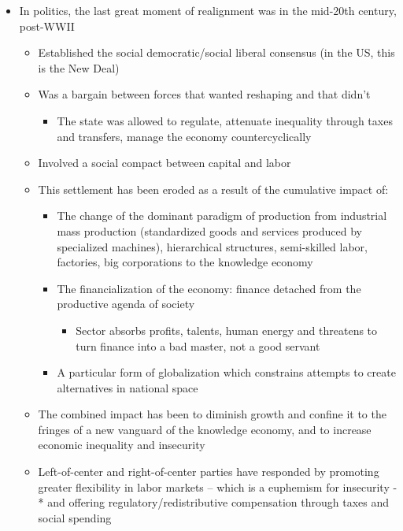 \begin{itemize}
\tightlist
\item
  In politics, the last great moment of realignment was in the mid-20th
  century, post-WWII

  \begin{itemize}
  \tightlist
  \item
    Established the social democratic/social liberal consensus (in the
    US, this is the New Deal)
  \item
    Was a bargain between forces that wanted reshaping and that didn't

    \begin{itemize}
    \tightlist
    \item
      The state was allowed to regulate, attenuate inequality through
      taxes and transfers, manage the economy countercyclically
    \end{itemize}
  \item
    Involved a social compact between capital and labor
  \item
    This settlement has been eroded as a result of the cumulative impact
    of:

    \begin{itemize}
    \tightlist
    \item
      The change of the dominant paradigm of production from industrial
      mass production (standardized goods and services produced by
      specialized machines), hierarchical structures, semi-skilled
      labor, factories, big corporations to the knowledge economy
    \item
      The financialization of the economy: finance detached from the
      productive agenda of society

      \begin{itemize}
      \tightlist
      \item
        Sector absorbs profits, talents, human energy and threatens to
        turn finance into a bad master, not a good servant
      \end{itemize}
    \item
      A particular form of globalization which constrains attempts to
      create alternatives in national space
    \end{itemize}
  \item
    The combined impact has been to diminish growth and confine it to
    the fringes of a new vanguard of the knowledge economy, and to
    increase economic inequality and insecurity
  \item
    Left-of-center and right-of-center parties have responded by
    promoting greater flexibility in labor markets -- which is a
    euphemism for insecurity -* and offering regulatory/redistributive
    compensation through taxes and social spending


\end{itemize}
\end{itemize}
